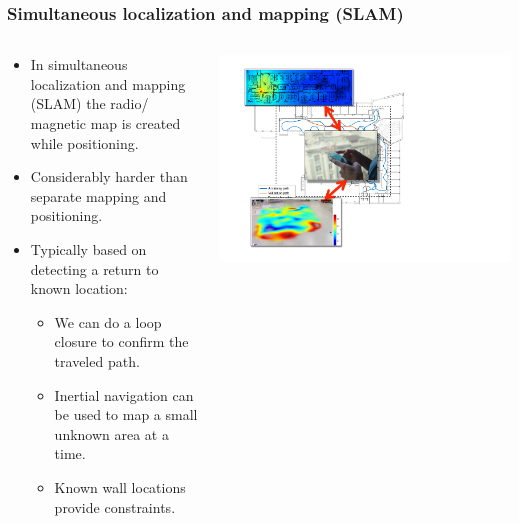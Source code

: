 \documentclass[xcolor=svgnames,english,handout]{beamer}
\begin{document}
\begin{frame}
  \frametitle{Simultaneous localization and mapping (SLAM)}

  \begin{columns}
  \begin{column}{0.5\textwidth}
  \begin{itemize}[<+->]       
  \item In \alert{simultaneous localization and mapping (SLAM)} the radio/ magnetic
  map is created while positioning.
  \item Considerably \alert{harder} than \alert{separate mapping and positioning}.
  \item Typically based on detecting a \alert{return to known location}:
  \begin{itemize}[<+->]       
  \item We can do a \alert{loop closure} to confirm the traveled path.
  \item \alert{Inertial navigation} can be used to map a small unknown area at a time.
  \item Known wall locations provide \alert{constraints}.
  \end{itemize}
  \end{itemize}
  \end{column}
  \begin{column}{0.5\textwidth}
  \includegraphics[width=\columnwidth]{slam} \\
  \end{column}
  \end{columns}
\end{frame}
\end{document}
